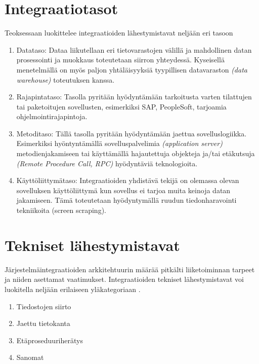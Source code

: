 \section{Integraatiotasot}

Teoksessaan \citep{linthicum2000enterprise} luokittelee integraatioiden lähestymistavat neljään eri tasoon

\begin{enumerate}
   \item Datataso: Dataa liikutellaan eri tietovarastojen välillä ja mahdollinen datan prosessointi ja muokkaus toteutetaan siirron yhteydessä. Kyseisellä menetelmällä on myös paljon yhtäläisyyksiä tyypillisen datavaraston \textit{(data warehouse)} toteutuksen kanssa.
   \item Rajapintataso: Tasolla pyritään hyödyntämään tarkoitusta varten tilattujen tai paketoitujen sovellusten, esimerkiksi SAP, PeopleSoft, tarjoamia ohjelmointirajapintoja.
   \item Metoditaso: Tällä tasolla pyritään hyödyntämään jaettua sovelluslogiikka. Esimerkiksi hyöntyntämällä sovelluspalvelimia \textit{(application server)} metodienjakamiseen tai käyttämällä hajautettuja objekteja ja/tai etäkutsuja \textit{(Remote Procedure Call, RPC)} hyödyntäviä teknologioita.
   \item Käyttöliittymätaso: Integraatioiden yhdistävä tekijä on olemassa olevan sovelluksen käyttöliittymä kun sovellus ei tarjoa muita keinoja datan jakamiseen. Tämä toteutetaan hyödyntymällä ruudun tiedonharavointi tekniikoita (screen scraping).
   
\end{enumerate}

\section{Tekniset lähestymistavat}

Järjestelmäintegraatioiden arkkitehtuurin määrää pitkälti liiketoiminnan tarpeet ja niiden asettamat vaatimukset. Integraatioiden tekniset lähestymistavat voi luokitella neljään erilaiseen yläkategoriaan \citep[sivu~64]{Hohpe2004}.

\begin{enumerate}
   \item Tiedostojen siirto
   \item Jaettu tietokanta
   \item Etäproseduuriherätys
   \item Sanomat
   
\end{enumerate}

